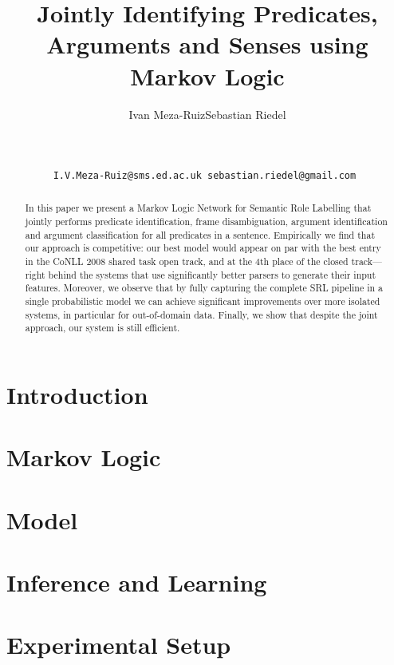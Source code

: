 \documentclass[11pt]{article}
\title{Jointly Identifying Predicates, Arguments and Senses using Markov
Logic}
\author{
Ivan Meza-Ruiz\footnotemark[1]  \qquad Sebastian Riedel\footnotemark[2] \footnotemark[3]   \\
\footnotemark[1]  {School of Informatics, University of Edinburgh, UK}\\
\footnotemark[2]  {Department of Computer Science, University of Tokyo, Japan}\\
\footnotemark[3]  {Database Center for Life Science, Research Organization of Information and System, Japan}\\
\footnotemark[1]  \tt  I.V.Meza-Ruiz@sms.ed.ac.uk \footnotemark[2] \tt sebastian.riedel@gmail.com
}
\begin{document}


\maketitle

\begin{abstract}
In this paper we present a Markov Logic Network for Semantic Role
Labelling that jointly performs predicate identification, frame
disambiguation, argument identification and argument classification
for all predicates in a sentence. Empirically we find that our
approach is competitive: our best model would appear on par
with the best entry in the CoNLL 2008 shared task open track, and at
the 4th place of the closed track---right behind the systems that use
significantly better parsers to generate their input features.
Moreover, we observe
that by fully capturing the complete SRL pipeline in a single
probabilistic model we can achieve significant improvements over more isolated systems, in particular for out-of-domain
data. Finally, we show that despite the joint approach, our
system is still efficient. 
\end{abstract} 


\section{Introduction}




\section{Markov Logic} \label{sec:markovlogic}



\section{Model} \label{sec:model} 



\section{Inference and Learning}\label{sec:inference}




\section{Experimental Setup}
\label{sec:experiments}

\end{document}
